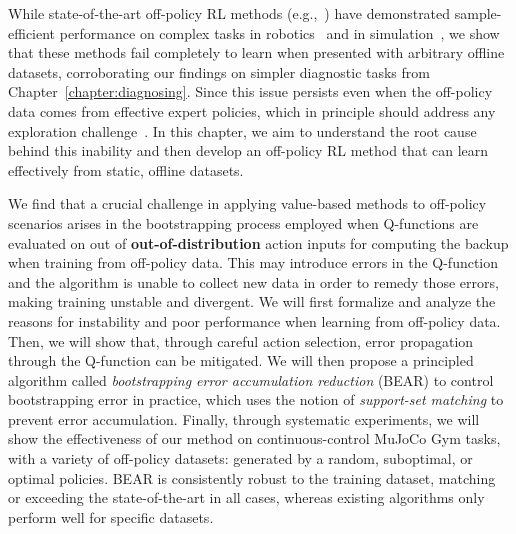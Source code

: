 While state-of-the-art off-policy RL methods   (e.g.,~\citep{haarnoja2018sac,munos2016safe,kalashnikov18qtopt,impala2018}) have demonstrated sample-efficient performance on complex tasks in robotics~\cite{kalashnikov18qtopt} and in simulation~\cite{mujoco}, we show that these methods fail completely to learn when presented with arbitrary offline datasets, corroborating our findings on simpler diagnostic tasks from Chapter~\ref{chapter:diagnosing}. Since this issue persists even when the off-policy data comes from effective expert policies, which in principle should address any exploration challenge~\citep{deBruin2015importance,fujimoto2018off,fu2019diagnosing}. In this chapter, we aim to understand the root cause behind this inability and then develop an off-policy RL method that can learn effectively from static, offline datasets. 

We find that a crucial challenge in applying value-based methods to off-policy scenarios arises in the bootstrapping process employed
when Q-functions are evaluated on out of \textbf{out-of-distribution} action inputs for computing the backup when training from off-policy data. This may introduce errors in the Q-function and the algorithm is unable to collect new data in order to remedy those errors, making training unstable and divergent. We will first formalize and analyze the reasons for instability and poor performance when learning from off-policy data. Then, we will show that, through careful action selection, error propagation through the Q-function can be mitigated. We will then propose a principled algorithm called \emph{bootstrapping error accumulation reduction} (BEAR) to control bootstrapping error in practice, which uses the notion of \emph{support-set matching} to prevent error accumulation. Finally, through systematic experiments, we will show the effectiveness of our method on continuous-control MuJoCo Gym tasks, with a variety of off-policy datasets: generated by a random, suboptimal, or optimal policies. BEAR is consistently robust to the training dataset, matching or exceeding the state-of-the-art in all cases, whereas existing algorithms only perform well for specific datasets.


